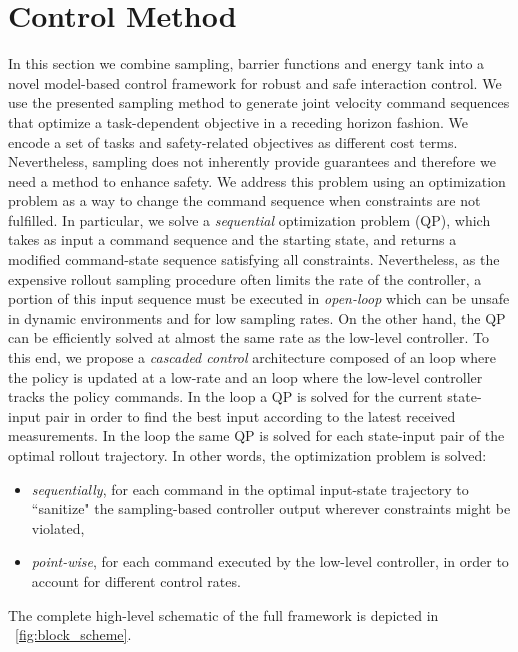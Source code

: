 \section{Control Method} \label{sec:control_method}

In this section we combine sampling, barrier functions and energy tank into a novel model-based control framework for robust and safe interaction control. We use the presented sampling method to generate joint velocity command sequences that optimize a task-dependent objective in a receding horizon fashion. We encode a set of tasks and safety-related objectives as different cost terms. Nevertheless, sampling does not inherently provide guarantees and therefore we need a method to enhance safety. We address this problem using an optimization problem as a  way to change the command sequence when constraints are not fulfilled. In particular, we solve a \textit{sequential} optimization problem (QP), which takes as input a command sequence and the starting state, and returns a modified command-state sequence satisfying all constraints. Nevertheless, as the expensive rollout sampling procedure often limits the rate of the controller, a portion of this input sequence must be executed in \textit{open-loop} which can be unsafe in dynamic environments and for low sampling rates. On the other hand, the QP can be efficiently solved at almost the same rate as the low-level controller. To this end, we propose a \emph{cascaded control} architecture composed of an  loop where the policy is updated at a low-rate and an  loop  where the low-level controller tracks the policy commands. In the  loop a QP is solved for the current state-input pair in order to find the best input according to the latest received measurements. In the  loop the same QP is solved for each state-input pair of the optimal rollout trajectory.
In other words, the optimization problem is solved:
\begin{itemize}
    \item \textit{sequentially}, for each command in the optimal input-state trajectory to ``sanitize" the sampling-based controller output wherever constraints might be violated,
    \item \textit{point-wise}, for each command executed by the low-level controller, in order to account for different control rates.
\end{itemize}
The complete high-level schematic of the full framework is depicted in \fig~\ref{fig:block_scheme}.   

